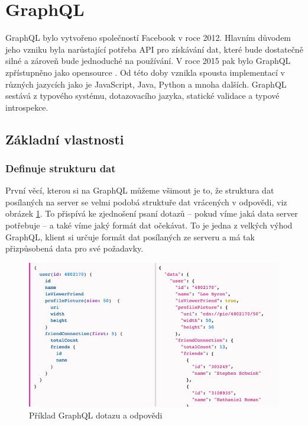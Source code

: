 \documentclass[thesis=M,czech]{FITthesis}[2019/12/23]
\begin{document}
\section{GraphQL}
GraphQL bylo vytvořeno společností Facebook v roce 2012. Hlavním důvodem jeho vzniku byla narůstající potřeba API pro získávání dat, které bude dostatečně silné a zároveň bude jednoduché na používání. V roce 2015 pak bylo GraphQL zpřístupněno jako opensource \cite{graphql_fb}. Od této doby vznikla spousta implementací v různých jazycích jako je JavaScript, Java, Python a mnoha dalších. GraphQL sestává z typového systému, dotazovacího jazyka, statické validace a typové introspekce.

\subsection{Základní vlastnosti}
\subsubsection*{Definuje strukturu dat}
První věcí, kterou si na GraphQL můžeme všimout je to, že struktura dat posílaných na server se velmi podobá struktuře dat vrácených v odpovědi, viz obrázek \ref{graphql-query}. To přispívá ke zjednošení psaní dotazů -- pokud víme jaká data server potřebuje -- a také víme jaký formát dat očekávat. To je jedna z velkých výhod GraphQL, klient si určuje formát dat posílaných ze serveru a má tak přizpůsobená data pro své požadavky.

\begin{figure}[h]
    \includegraphics[width=\linewidth]{img/graphql-query.png}
    \caption{Příklad GraphQL dotazu a odpovědi \cite{graphql_query_img}}
	\label{graphql-query}
\end{figure}
\end{document}
